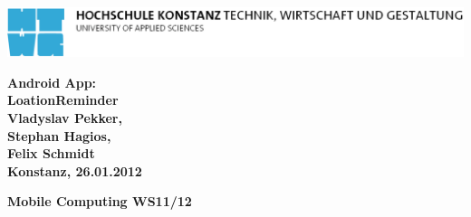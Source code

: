 \begin{titlepage}

\vspace*{-3.5cm}

\begin{flushleft}
\hspace*{-1cm} \includegraphics[width=15.7cm]{../resources/htwg-logo}
\end{flushleft}

\vspace{2.5cm}

\begin{center}
	\Huge{
		\textbf{Android App:\\
				LoationReminder} \\[4cm]
	}
	\Large{
		\textbf{Vladyslav Pekker,\\
				Stephan Hagios,\\
				Felix Schmidt}} \\[5cm]
	\large{
		\textbf{Konstanz, 26.01.2012} \\[2.5cm]
	}
	
	\huge{
		\textbf{{\sf Mobile Computing WS11/12}}
	}
\end{center}

\end{titlepage}